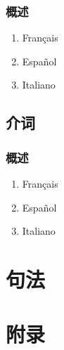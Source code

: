 \documentclass[UTF8,a4paper,titlepage,10pt]{report}
\begin{document}
\section{概述}
\label{sec:org5fb9105}

\begin{enumerate}
\item Français
\label{sec:orge4f10c4}

\item Español
\label{sec:orgc97f735}

\item Italiano
\label{sec:orga800ab8}
\end{enumerate}

\chapter{介词}
\label{sec:org6338258}

\section{概述}
\label{sec:org89f5a58}

\begin{enumerate}
\item Français
\label{sec:org5beb674}

\item Español
\label{sec:org8e07247}

\item Italiano
\label{sec:orgbc73f48}
\end{enumerate}

\part{句法}
\label{sec:org8c63638}

\newpage
\part{附录}
\label{sec:orge3ab3f0}

\listoftables

\listoffigures

\printindex
\end{document}
